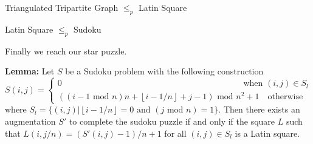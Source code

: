 \documentclass[final]{beamer}
\newlength{\colwidth}
\newcounter{col}
\begin{document}
\begin{frame}[t]
\begin{columns}[t]
\begin{column}{\colwidth}
\begin{block}{Triangulated Tripartite Graph $\leq_p$ Latin Square \cite{COLBOURN198425}}
  \end{block}
\begin{block}{ Latin Square $\leq_p$ Sudoku \cite{article}}

Finally we reach our star puzzle.

\textbf{Lemma:} Let $S$ be a Sudoku problem with the following construction 
\begin{equation}
	S(i,j) =\begin{cases}
0 \qquad\qquad\qquad\qquad\qquad\qquad\qquad\qquad\quad\qquad\qquad\text{   when  } (i,j) \in S_l \\ 
((i-1 \text{ mod } n)n + \left\lfloor{i-1/n}\right\rfloor+j-1)\text{ mod } n^2 +1 \quad\text{otherwise}
\end{cases}
\end{equation}
where $S_l=\{(i,j)| \left\lfloor{i-1/n}\right\rfloor=0 \text{ and }(j \text{ mod }n)=1\}$. Then there exists an augmentation $S'$ to complete the sudoku puzzle if and only if the square $L$ such that $L(i,j/n)=(S'(i,j)-1)/n+1$ for all $(i,j) \in S_l$ is a Latin square.


\end{block}
\end{column}
\end{columns}
\end{frame}
\end{document}
